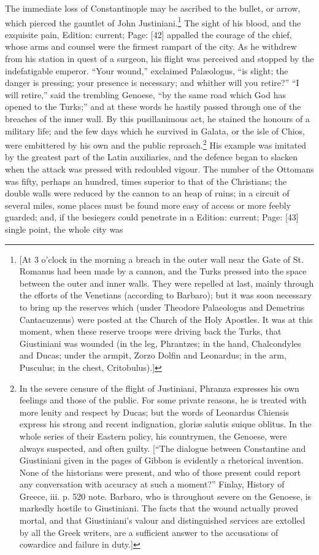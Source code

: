 The immediate loss of Constantinople may be ascribed to the bullet, or arrow, which pierced the gauntlet of John Justiniani.\footnote{[At 3 o\texthebrew{}’clock in the morning a breach in the outer wall near the Gate of St. Romanus had been made by a cannon, and the Turks pressed into the space between the outer and inner walls. They were repelled at last, mainly through the efforts of the Venetians (according to Barbaro); but it was soon necessary to bring up the reserves which (under Theodore Palaeologus and Demetrius Cantacuzenus) were posted at the Church of the Holy Apostles. It was at this moment, when these reserve troops were driving back the Turks, that Giustiniani was wounded (in the leg, Phrantzes; in the hand, Chalcondyles and Ducas; under the armpit, Zorzo Dolfin and Leonardus; in the arm, Pusculus; in the chest, Critobulus).]} The sight of his blood, and the exquisite pain, Edition: current; Page: [42] appalled the courage of the chief, whose arms and counsel were the firmest rampart of the city. As he withdrew from his station in quest of a surgeon, his flight was perceived and stopped by the indefatigable emperor. \texthebrew{“}Your wound,\texthebrew{}” exclaimed Palæologus, \texthebrew{“}is slight; the danger is pressing; your presence is necessary; and whither will you retire?\texthebrew{” “}I will retire,\texthebrew{}” said the trembling Genoese, \texthebrew{“}by the same road which God has opened to the Turks;\texthebrew{}” and at these words he hastily passed through one of the breaches of the inner wall. By this pusillanimous act, he stained the honours of a military life; and the few days which he survived in Galata, or the isle of Chios, were embittered by his own and the public reproach.\footnote{In the severe censure of the flight of Justiniani, Phranza expresses his own feelings and those of the public. For some private reasons, he is treated with more lenity and respect by Ducas; but the words of Leonardus Chiensis express his strong and recent indignation, gloriæ salutis suique oblitus. In the whole series of their Eastern policy, his countrymen, the Genoese, were always suspected, and often guilty. [\texthebrew{“}The dialogue between Constantine and Giustiniani given in the pages of Gibbon is evidently a rhetorical invention. None of the historians were present, and who of those present could report any conversation with accuracy at such a moment?\texthebrew{}” Finlay, History of Greece, iii. p. 520 note. Barbaro, who is throughout severe on the Genoese, is markedly hostile to Giustiniani. The facts that the wound actually proved mortal, and that Giustiniani\texthebrew{}’s valour and distinguished services are extolled by all the Greek writers, are a sufficient answer to the accusations of cowardice and failure in duty.]} His example was imitated by the greatest part of the Latin auxiliaries, and the defence began to slacken when the attack was pressed with redoubled vigour. The number of the Ottomans was fifty, perhaps an hundred, times superior to that of the Christians; the double walls were reduced by the cannon to an heap of ruins; in a circuit of several miles, some places must be found more easy of access or more feebly guarded; and, if the besiegers could penetrate in a Edition: current; Page: [43] single point, the whole city was 